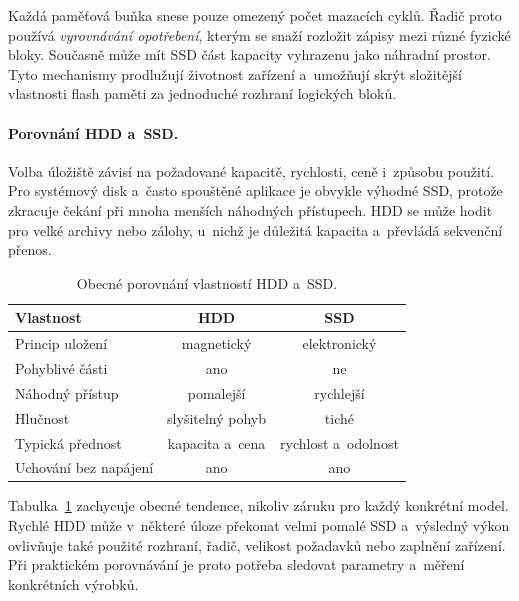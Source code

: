 Každá paměťová buňka snese pouze omezený počet mazacích cyklů. Řadič proto používá \emph{vyrovnávání opotřebení}, kterým se snaží rozložit zápisy mezi různé fyzické bloky. Současně může mít SSD část kapacity vyhrazenu jako náhradní prostor. Tyto mechanismy prodlužují životnost zařízení a~umožňují skrýt složitější vlastnosti flash paměti za jednoduché rozhraní logických bloků.


\paragraph{Porovnání HDD a~SSD.}

Volba úložiště závisí na požadované kapacitě, rychlosti, ceně i~způsobu použití. Pro systémový disk a~často spouštěné aplikace je obvykle výhodné SSD, protože zkracuje čekání při mnoha menších náhodných přístupech. HDD se může hodit pro velké archivy nebo zálohy, u~nichž je důležitá kapacita a~převládá sekvenční přenos.

\begin{table}[ht]
    \centering
    \begin{tabular}{|l|c|c|}
        \hline
        \textbf{Vlastnost} & \textbf{HDD} & \textbf{SSD} \\ \hline
        Princip uložení & magnetický & elektronický \\ \hline
        Pohyblivé části & ano & ne \\ \hline
        Náhodný přístup & pomalejší & rychlejší \\ \hline
        Hlučnost & slyšitelný pohyb & tiché \\ \hline
        Typická přednost & kapacita a~cena & rychlost a~odolnost \\ \hline
        Uchování bez napájení & ano & ano \\ \hline
    \end{tabular}
    \caption{Obecné porovnání vlastností HDD a~SSD.}
    \label{tab:hw-hdd-ssd}
\end{table}

Tabulka~\ref{tab:hw-hdd-ssd} zachycuje obecné tendence, nikoliv záruku pro každý konkrétní model. Rychlé HDD může v~některé úloze překonat velmi pomalé SSD a~výsledný výkon ovlivňuje také použité rozhraní, řadič, velikost požadavků nebo zaplnění zařízení. Při praktickém porovnávání je proto potřeba sledovat parametry a~měření konkrétních výrobků.
